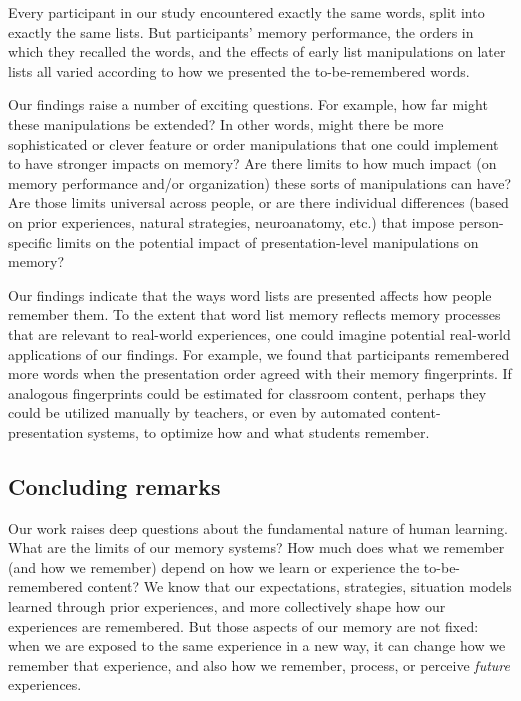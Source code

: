 \documentclass[11pt]{article}
\begin{document}
Every participant in our study encountered exactly the same words, split into
exactly the same lists. But participants' memory performance, the orders in
which they recalled the words, and the effects of early list manipulations on
later lists all varied according to how we presented the to-be-remembered
words.

Our findings raise a number of exciting questions. For example, how far might
these manipulations be extended? In other words, might there be more
sophisticated or clever feature or order manipulations that one could implement
to have stronger impacts on memory? Are there limits to how much impact (on
memory performance and/or organization) these sorts of manipulations can have?
Are those limits universal across people, or are there individual differences
(based on prior experiences, natural strategies, neuroanatomy, etc.) that
impose person-specific limits on the potential impact of presentation-level
manipulations on memory?

Our findings indicate that the ways word lists are presented affects how people
remember them. To the extent that word list memory reflects memory processes
that are relevant to real-world experiences, one could imagine potential
real-world applications of our findings. For example, we found that
participants remembered more words when the presentation order agreed with
their memory fingerprints. If analogous fingerprints could be estimated for
classroom content, perhaps they could be utilized manually by teachers, or even
by automated content-presentation systems, to optimize how and what students
remember.



\subsection*{Concluding remarks}

Our work raises deep questions about the fundamental nature of human learning.
What are the limits of our memory systems? How much does what we remember (and
how we remember) depend on how we learn or experience the to-be-remembered
content? We know that our expectations, strategies, situation models learned
through prior experiences, and more collectively shape how our experiences are
remembered. But those aspects of our memory are not fixed: when we are exposed
to the same experience in a new way, it can change how we remember
that experience, and also how we remember, process, or perceive
\textit{future} experiences.



\end{document}
